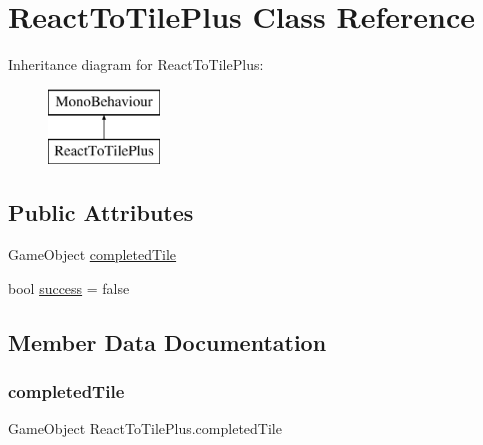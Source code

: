 \hypertarget{class_react_to_tile_plus}{}\section{React\+To\+Tile\+Plus Class Reference}
\label{class_react_to_tile_plus}
Inheritance diagram for React\+To\+Tile\+Plus\+:\begin{figure}[H]
\begin{center}
\leavevmode
\includegraphics[height=2.000000cm]{class_react_to_tile_plus}
\end{center}
\end{figure}
\subsection*{Public Attributes}
\begin{DoxyCompactItemize}
\item 
Game\+Object \hyperlink{class_react_to_tile_plus_ad932fc1f16556df940db98bee6a2fc47}{completed\+Tile}
\item 
bool \hyperlink{class_react_to_tile_plus_a2c639c5ac0af2d57927d7353a6e6b951}{success} = false
\end{DoxyCompactItemize}


\subsection{Member Data Documentation}
\mbox{\label{class_react_to_tile_plus_ad932fc1f16556df940db98bee6a2fc47}} 
\subsubsection{\texorpdfstring{completed\+Tile}{completedTile}}
{\footnotesize\ttfamily Game\+Object React\+To\+Tile\+Plus.\+completed\+Tile}

\mbox{\label{class_react_to_tile_plus_a2c639c5ac0af2d57927d7353a6e6b951}} 
